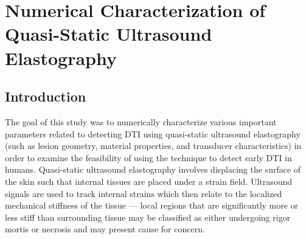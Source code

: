 \chapter{Numerical Characterization of Quasi-Static Ultrasound Elastography}
	\label{chap:quasi-static}
	\section{Introduction}
		The goal of this study was to numerically characterize various important parameters related to detecting DTI using quasi-static ultrasound elastography (such as lesion geometry, material properties, and transducer characteristics) in order to examine the feasibility of using the technique to detect early DTI in humans. Quasi-static ultrasound elastography involves displacing the surface of the skin such that internal tissues are placed under a strain field. Ultrasound signals are used to track internal strains which then relate to the localized mechanical stiffness of the tissue --- local regions that are significantly more or less stiff than surrounding tissue may be classified as either undergoing rigor mortis or necrosis and may present cause for concern.
		
